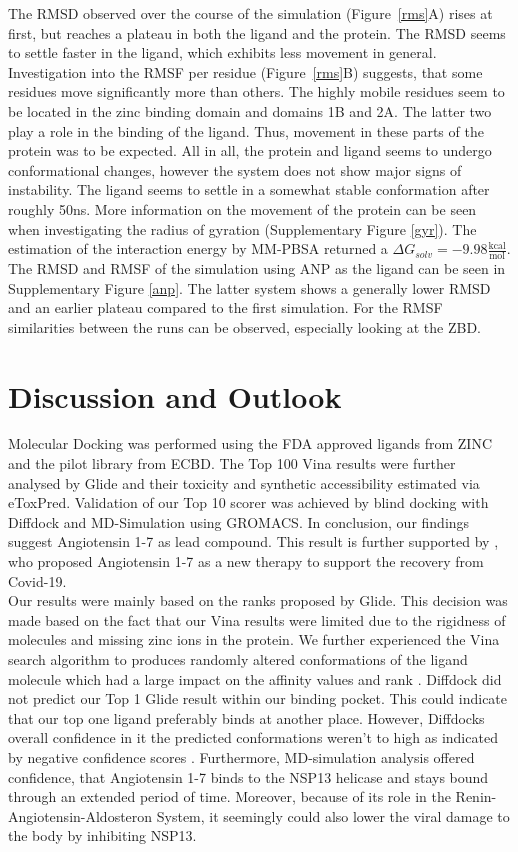 \documentclass[11pt, letterpaper, titlepage]{article}
\renewcommand{\cite}{\parencite}
\begin{document}
The \ac{RMSD} observed over the course of the simulation (Figure~\ref{rms}A) rises at first, but reaches a plateau in both the ligand and the protein. The RMSD seems to settle faster in the ligand, which exhibits less movement in general. Investigation into the RMSF per residue (Figure~\ref{rms}B) suggests, that some residues move significantly more than others. The highly mobile residues seem to be located in the zinc binding domain and domains 1B and 2A. The latter two play a role in the binding of the ligand. Thus, movement in these parts of the protein was to be expected. All in all, the protein and ligand seems to undergo conformational changes, however the system does not show major signs of instability. The ligand seems to settle in a somewhat stable conformation after roughly 50ns. More information on the movement of the protein can be seen when investigating the radius of gyration (Supplementary Figure \ref{gyr}). The estimation of the interaction energy by \ac{MM-PBSA} returned a $\Delta G_{solv} = -9.98 \frac{\textrm{kcal}}{\textrm{mol}}$. The RMSD and RMSF of the simulation using ANP as the ligand can be seen in Supplementary Figure \ref{anp}. The latter system shows a generally lower RMSD and an earlier plateau compared to the first simulation. For the RMSF similarities between the runs can be observed, especially looking at the ZBD. 

\FloatBarrier

\section{Discussion and Outlook}
Molecular Docking was performed using the FDA approved ligands from ZINC and the pilot library from ECBD. The Top 100 Vina results were further analysed by Glide and their toxicity and synthetic accessibility estimated via eToxPred. Validation of our Top 10 scorer was achieved by blind docking with Diffdock and MD-Simulation using GROMACS. In conclusion, our findings suggest Angiotensin 1-7 as lead compound. This result is further supported by \textcite{angio}, who proposed Angiotensin 1-7 as a new therapy to support the recovery from Covid-19.\\
Our results were mainly based on the ranks proposed by Glide. This decision was made based on the fact that our Vina results were limited due to the rigidness of molecules and missing zinc ions in the protein. We further experienced the Vina search algorithm to produces randomly altered conformations of the ligand molecule which had a large impact on the affinity values and rank \cite{Zev201}. Diffdock did not predict our Top 1 Glide result within our binding pocket. This could indicate that our top one ligand preferably binds at another place. However, Diffdocks overall confidence in it the predicted conformations weren't to high as indicated by negative confidence scores \cite{Corso.2022}. Furthermore, MD-simulation analysis offered confidence, that Angiotensin 1-7 binds to the NSP13 helicase and stays bound through an extended period of time.  Moreover, because of its role in the Renin-Angiotensin-Aldosteron System, it seemingly could also lower the viral damage to the body by inhibiting NSP13.\\\\
\end{document}
